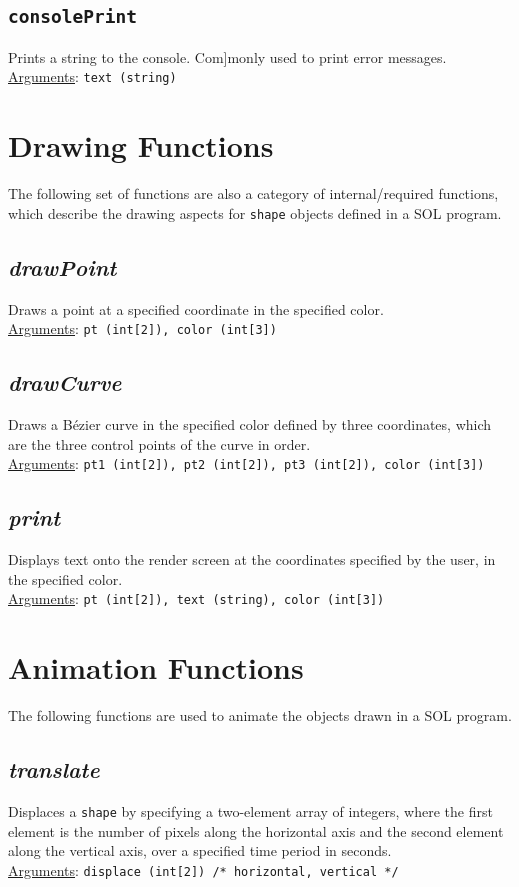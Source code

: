 \documentclass[letterpaper,12pt]{article}
\begin{document}
    \subsection{\texttt{consolePrint}}
    Prints a string to the console. Com]monly used to print error messages.\\
\underline{Arguments}: \texttt{text (string)}


\section{Drawing Functions}
The following set of functions are also a category of internal/required functions, which describe the drawing aspects for \texttt{shape} objects defined in a SOL program.

\subsection{\textit{drawPoint}}
Draws a point at a specified coordinate in the specified color.\\
\underline{Arguments}: \texttt{pt (int[2]), color (int[3])}

\subsection{\textit{drawCurve}}
Draws a B\'ezier curve in the specified color defined by three coordinates, which are the three control points of the curve in order.\\
\underline{Arguments}: \texttt{pt1 (int[2]), pt2 (int[2]), pt3 (int[2]), color (int[3])}

\subsection{\textit{print}}
Displays text onto the render screen at the coordinates specified by the user, in the specified color.\\
\underline{Arguments}: \texttt{pt (int[2]), text (string), color (int[3])}

\section{Animation Functions} \label{animation}
The following functions are used to animate the objects drawn in a SOL program.

\subsection{\textit{translate}}
Displaces a \texttt{shape} by specifying a two-element array of integers, where the first element is the number of pixels along the horizontal axis and the second element along the vertical axis, over a specified time period in seconds.\\
\underline{Arguments}: \texttt{displace (int[2]) /* horizontal, vertical */}
\end{document}
